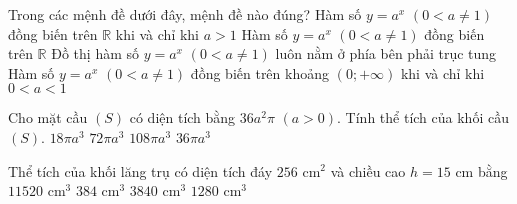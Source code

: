 \begin{ex}%
Trong các mệnh đề dưới đây, mệnh đề nào đúng?
\choice
{\True Hàm số $y=a^x$ $(0<a\neq 1)$ đồng biến trên $\mathbb{R}$ khi và chỉ khi $a>1$}
{Hàm số $y=a^x$ $(0<a\neq 1)$ đồng biến trên $\mathbb{R}$}
{Đồ thị hàm số $y=a^x$ $(0<a\neq 1)$ luôn nằm ở phía bên phải trục tung}
{Hàm số $y=a^x$ $(0<a\neq 1)$ đồng biến trên khoảng $(0;+\infty)$ khi và chỉ khi $0<a<1$}
\end{ex}

\begin{ex}%
Cho mặt cầu $(S)$ có diện tích bằng $36a^2\pi$ $(a>0)$. Tính thể tích của khối cầu $(S)$.
\choice
{$18\pi a^3$}
{$72\pi a^3$}
{$108\pi a^3$}
{\True $36\pi a^3$}
\end{ex}

\begin{ex}%
Thể tích của khối lăng trụ có diện tích đáy $256$ $\mathrm{cm}^2$ và chiều cao $h=15$ cm bằng
\choice
{$11520$ $\mathrm{cm}^3$}
{$384$ $\mathrm{cm}^3$}
{\True $3840$ $\mathrm{cm}^3$}
{$1280$ $\mathrm{cm}^3$}
\end{ex}

